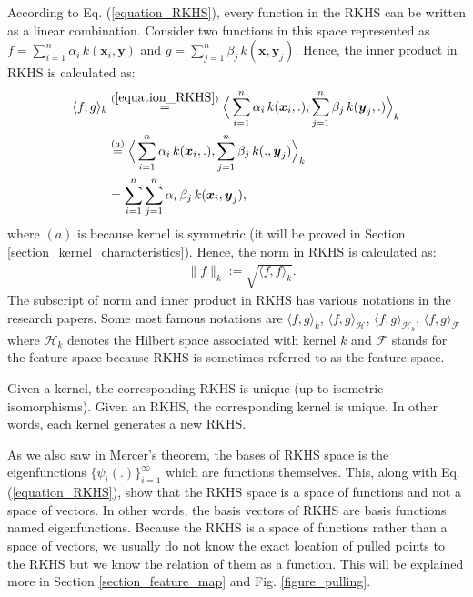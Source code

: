 \documentclass[lang=cn,10pt]{gorgeousnbook}
\numberwithin{equation}{section}%
\numberwithin{figure}{section}%
\begin{document}
According to Eq. (\ref{equation_RKHS}), every function in the RKHS can be written as a linear combination. Consider two functions in this space represented as $f = \sum_{i=1}^n \alpha_i\, k(\boldsymbol{x}_i, \boldsymbol{y})$ and $g = \sum_{j=1}^n \beta_j\, k(\boldsymbol{x}, \boldsymbol{y}_j)$. Hence, the inner product in RKHS is calculated as:
\begin{align}
\langle f,g \rangle_k &\overset{(\ref{equation_RKHS})}{=} \Big\langle \sum_{i=1}^n \alpha_i\, k(\boldsymbol{x}_i, .), \sum_{j=1}^n \beta_j\, k(\boldsymbol{y}_j, .) \Big\rangle_k \nonumber \\
&\overset{(a)}{=} \Big\langle \sum_{i=1}^n \alpha_i\, k(\boldsymbol{x}_i, .), \sum_{j=1}^n \beta_j\, k(., \boldsymbol{y}_j) \Big\rangle_k \nonumber \\
&= \sum_{i=1}^n \sum_{j=1}^n \alpha_i\, \beta_j\, k(\boldsymbol{x}_i, \boldsymbol{y}_j), \label{equation_RKHS_inner_product}
\end{align}
where $(a)$ is because kernel is symmetric (it will be proved in Section \ref{section_kernel_characteristics}).
Hence, the norm in RKHS is calculated as:
\begin{align}
&\|f\|_k := \sqrt{\langle f,f \rangle_k}.
\end{align}
The subscript of norm and inner product in RKHS has various notations in the research papers. Some most famous notations are $\langle f,g \rangle_k$, $\langle f,g \rangle_\mathcal{H}$, $\langle f,g \rangle_{\mathcal{H}_k}$, $\langle f,g \rangle_\mathcal{F}$ where $\mathcal{H}_k$ denotes the Hilbert space associated with kernel $k$ and $\mathcal{F}$ stands for the feature space because RKHS is sometimes referred to as the feature space.

\begin{remark}
Given a kernel, the corresponding RKHS is unique (up to isometric isomorphisms). Given an RKHS, the corresponding kernel is unique. In other words, each kernel generates a new RKHS. 
\end{remark}

\begin{remark}
As we also saw in Mercer's theorem, the bases of RKHS space is the eigenfunctions $\{\psi_i(.)\}_{i=1}^\infty$ which are functions themselves. This, along with Eq. (\ref{equation_RKHS}), show that the RKHS space is a space of functions and not a space of vectors. In other words, the basis vectors of RKHS are basis functions named eigenfunctions. 
Because the RKHS is a space of functions rather than a space of vectors, we usually do not know the exact location of pulled points to the RKHS but we know the relation of them as a function. This will be explained more in Section \ref{section_feature_map} and Fig. \ref{figure_pulling}. 
\end{remark}
\end{document}
